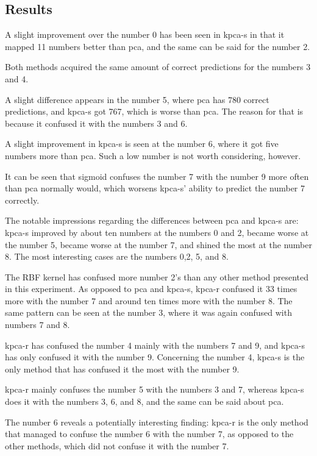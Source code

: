 \subsection{Results}
A slight improvement over the number 0 has been seen in \gls{kpca-s} in that it mapped 11 numbers better than \gls{pca}, and the same can be said for the number 2.

Both methods acquired the same amount of correct predictions for the numbers 3 and 4.

A slight difference appears in the number 5, where \gls{pca} has 780 correct predictions, and \gls{kpca-s} got 767, which is worse than \gls{pca}. The reason for that is because it confused it with the numbers 3 and 6.


A slight improvement in \gls{kpca-s} is seen at the number 6, where it got five numbers more than \gls{pca}. Such a low number is not worth considering, however.

It can be seen that sigmoid confuses the number 7 with the number 9 more often than \gls{pca} normally would, which worsens \gls{kpca-s}' ability to predict the number 7 correctly.

The notable impressions regarding the differences between \gls{pca} and \gls{kpca-s} are: \gls{kpca-s} improved by about ten numbers at the numbers 0 and 2, became worse at the number 5, became worse at the number 7, and shined the most at the number 8. The most interesting cases are the numbers 0,2, 5, and 8.


The RBF kernel has confused more number 2's than any other method presented in this experiment. As opposed to \gls{pca} and \gls{kpca-s}, \gls{kpca-r} confused it 33 times more with the number 7 and around ten times more with the number 8. The same pattern can be seen at the number 3, where it was again confused with numbers 7 and 8.


\gls{kpca-r} has confused the number 4 mainly with the numbers 7 and 9, and \gls{kpca-s} has only confused it with the number 9. Concerning the number 4, \gls{kpca-s} is the only method that has confused it the most with the number 9.


\gls{kpca-r} mainly confuses the number 5 with the numbers 3 and 7, whereas \gls{kpca-s} does it with the numbers 3, 6, and 8, and the same can be said about \gls{pca}.

The number 6 reveals a potentially interesting finding: \gls{kpca-r} is the only method that managed to confuse the number 6 with the number 7, as opposed to the other methods, which did not confuse it with the number 7.

